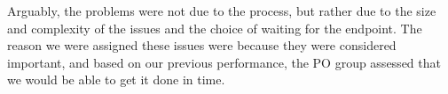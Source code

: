 Arguably, the problems were not due to the process, but rather due to the size and complexity of the issues and the choice of waiting for the endpoint. The reason we were assigned these issues were because they were considered important, and based on our previous performance, the PO group assessed that we would be able to get it done in time. 

